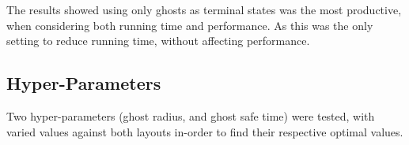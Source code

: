 \documentclass[letterpaper, 11pt, journal, final]{IEEEtran}
\begin{document}







The results showed using only ghosts as terminal states was the most productive, when considering both running time and performance. As this was the only setting to reduce running time, without affecting performance.


\subsection{Hyper-Parameters}
Two hyper-parameters (ghost radius, and ghost safe time) were tested, with varied values against both layouts in-order to find their respective optimal values.
\end{document}
